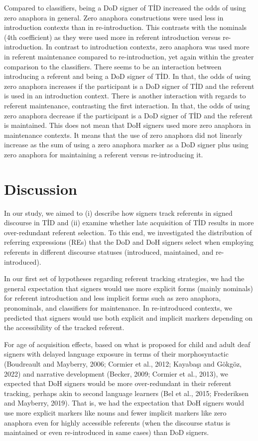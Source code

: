 \documentclass[]{elsarticle} %
\begin{document}
Compared to classifiers, being a DoD signer of TİD increased the odds of
using zero anaphora in general. Zero anaphora constructions were used
less in introduction contexts than in re-introduction. This contrasts
with the nominals (4th coefficient) as they were used more in referent
introduction versus re-introduction. In contrast to introduction
contexts, zero anaphora was used more in referent maintenance compared
to re-introduction, yet again within the greater comparison to the
classifiers. There seems to be an interaction between introducing a
referent and being a DoD signer of TİD. In that, the odds of using zero
anaphora increases if the participant is a DoD signer of TİD and the
referent is used in an introduction context. There is another
interaction with regards to referent maintenance, contrasting the first
interaction. In that, the odds of using zero anaphora decrease if the
participant is a DoD signer of TİD and the referent is maintained. This
does not mean that DoH signers used more zero anaphora in maintenance
contexts. It means that the use of zero anaphora did not linearly
increase as the sum of using a zero anaphora marker as a DoD signer plus
using zero anaphora for maintaining a referent versus re-introducing it.

\hypertarget{discussion}{%
\section{Discussion}\label{discussion}}

In our study, we aimed to (i) describe how signers track referents in
signed discourse in TİD and (ii) examine whether late acquisition of TİD
results in more over-redundant referent selection. To this end, we
investigated the distribution of referring expressions (REs) that the
DoD and DoH signers select when employing referents in different
discourse statuses (introduced, maintained, and re-introduced).

In our first set of hypotheses regarding referent tracking strategies,
we had the general expectation that signers would use more explicit
forms (mainly nominals) for referent introduction and less implicit
forms such as zero anaphora, pronominals, and classifiers for
maintenance. In re-introduced contexts, we predicted that signers would
use both explicit and implicit markers depending on the accessibility of
the tracked referent.

For age of acquisition effects, based on what is proposed for child and
adult deaf signers with delayed language exposure in terms of their
morphosyntactic (Boudreault and Mayberry, 2006; Cormier et al., 2012;
Kayabaşı and Gökgöz, 2022) and narrative development (Becker, 2009;
Cormier et al., 2013), we expected that DoH signers would be more
over-redundant in their referent tracking, perhaps akin to second
language learners (Bel et al., 2015; Frederiksen and Mayberry, 2019).
That is, we had the expectation that DoH signers would use more explicit
markers like nouns and fewer implicit markers like zero anaphora even
for highly accessible referents (when the discourse status is maintained
or even re-introduced in same cases) than DoD signers.
\end{document}
